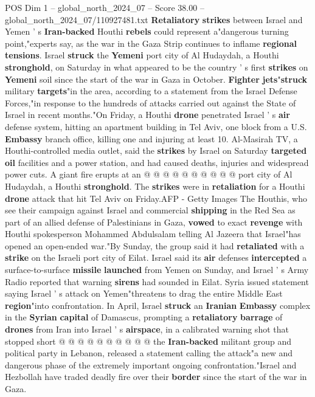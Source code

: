 \begin{textsample}{POS Dim 1 – global\_north\_2024\_07 – Score 38.00 – global\_north\_2024\_07/110927481.txt}  \label{ex:f1_pos_181}
\textbf{Retaliatory} \textbf{strikes} between Israel and Yemen ' s \textbf{Iran-backed} Houthi \textbf{rebels} could represent a"dangerous turning point,"experts say, as the war in the Gaza Strip continues to inflame \textbf{regional} \textbf{tensions}.
Israel \textbf{struck} the \textbf{Yemeni} port city of Al Hudaydah, a Houthi \textbf{stronghold}, on Saturday in what appeared to be the country ' s first \textbf{strikes} on \textbf{Yemeni} soil since the start of the war in Gaza in October. \textbf{Fighter} \textbf{jets}"\textbf{struck} military \textbf{targets}"in the area, according to a statement from the Israel Defense Forces,"in response to the hundreds of attacks carried out against the State of Israel in recent months."On Friday, a Houthi \textbf{drone} penetrated Israel ' s \textbf{air} defense system, hitting an apartment building in Tel Aviv, one block from a U.S. \textbf{Embassy} branch office, killing one and injuring at least 10.
Al-Masirah TV, a Houthi-controlled media outlet, said the \textbf{strikes} by Israel on Saturday \textbf{targeted} \textbf{oil} facilities and a power station, and had caused deaths, injuries and widespread power cuts.
A giant fire erupts at an @ @ @ @ @ @ @ @ @ @ port city of Al Hudaydah, a Houthi \textbf{stronghold}.
The \textbf{strikes} were in \textbf{retaliation} for a Houthi \textbf{drone} attack that hit Tel Aviv on Friday.AFP - Getty Images The Houthis, who see their campaign against Israel and commercial \textbf{shipping} in the Red Sea as part of an allied defense of Palestinians in Gaza, \textbf{vowed} to exact \textbf{revenge} with Houthi spokesperson Mohammed Abdulsalam telling Al Jazeera that Israel"has opened an open-ended war."By Sunday, the group said it had \textbf{retaliated} with a \textbf{strike} on the Israeli port city of Eilat.
Israel said its \textbf{air} defenses \textbf{intercepted} a surface-to-surface \textbf{missile} \textbf{launched} from Yemen on Sunday, and Israel ' s Army Radio reported that warning \textbf{sirens} had sounded in Eilat.
Syria issued statement saying Israel ' s attack on Yemen"threatens to drag the entire Middle East \textbf{region}"into confrontation.
In April, Israel \textbf{struck} an \textbf{Iranian} \textbf{Embassy} complex in the \textbf{Syrian} \textbf{capital} of Damascus, prompting a \textbf{retaliatory} \textbf{barrage} of \textbf{drones} from Iran into Israel ' s \textbf{airspace}, in a calibrated warning shot that stopped short @ @ @ @ @ @ @ @ @ @ the \textbf{Iran-backed} militant group and political party in Lebanon, released a statement calling the attack"a new and dangerous phase of the extremely important ongoing confrontation."Israel and Hezbollah have traded deadly fire over their \textbf{border} since the start of the war in Gaza.

\end{textsample}
